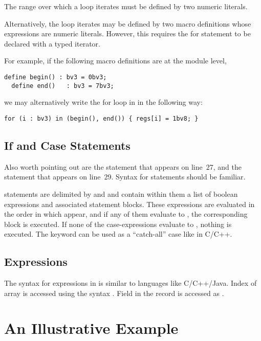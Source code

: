 The range over which a  loop iterates must be defined by two numeric literals.

Alternatively, the loop iterates may be defined by two macro definitions whose expressions are numeric literals. However, this requires the for statement to be declared with a typed iterator.

For example, if the following macro definitions are at the module level,
\begin{lstlisting}[language=uclid,style=uclidstyle]
  define begin() : bv3 = 0bv3;
  define end()   : bv3 = 7bv3;
\end{lstlisting}
we may alternatively write the for loop in  in the following way:
\begin{lstlisting}[language=uclid,style=uclidstyle]
  for (i : bv3) in (begin(), end()) { regs[i] = 1bv8; }
\end{lstlisting}

\subsection{If and Case Statements}
Also worth pointing out are the  statement that appears on line~27, and the  statement that appears on line~29. Syntax for  statements should be familiar.

 statements are delimited by  and  and contain within them a list of boolean expressions and associated statement blocks. These expressions are evaluated in the order in which appear, and if any of them evaluate to , the corresponding block is executed. If none of the case-expressions evaluate to , nothing is executed. The keyword  can be used as a ``catch-all'' case like in C/C++.

\subsection{Expressions}

The syntax for expressions in \uclid{} is similar to languages like C/C++/Java. Index  of array  is accessed using the syntax . Field  in the record  is accessed as .

\section{An Illustrative Example}

